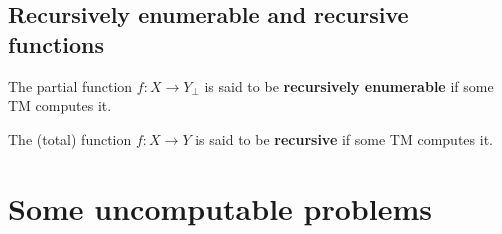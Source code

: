 \subsection{Recursively enumerable and recursive functions}

\begin{definition} The partial function $f:X\rightarrow Y_\bot$ is said to be
\textbf{recursively enumerable} if some TM computes it. \end{definition}

\begin{definition} The (total) function $f:X\rightarrow Y$ is said to be
\textbf{recursive} if some TM computes it. \end{definition}

\section{Some uncomputable problems}
